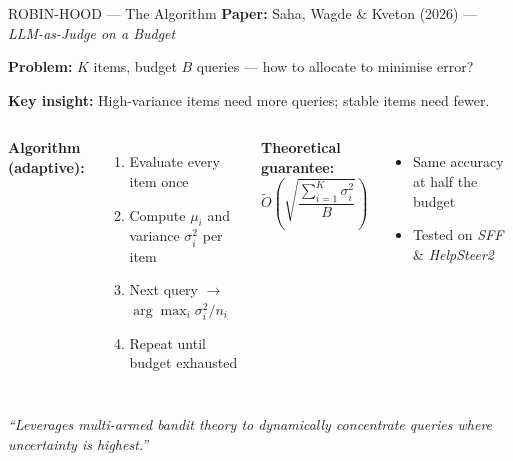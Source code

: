 \documentclass[11pt, aspectratio=169]{beamer}
\begin{document}
\begin{frame}{ROBIN-HOOD --- The Algorithm}
  \textbf{Paper:} Saha, Wagde \& Kveton (2026) --- \textit{LLM-as-Judge on a Budget}

  \vspace{0.1cm}
  \textbf{Problem:} $K$ items, budget $B$ queries --- how to allocate to minimise error?

  \vspace{0.1cm}
  \textbf{Key insight:} \alert{High-variance} items need more queries; stable items need fewer.

  \vspace{0.1cm}
  \begin{columns}[T]
      \textbf{Algorithm (adaptive):}
      \begin{enumerate}\footnotesize
        \item Evaluate every item once
        \item Compute $\mu_i$ and variance $\sigma^2_i$ per item
        \item Next query $\rightarrow$ $\arg\max_i \sigma^2_i / n_i$
        \item Repeat until budget exhausted
      \end{enumerate}

      \textbf{Theoretical guarantee:}
      \[
      \tilde{O}\!\left(\sqrt{\frac{\textstyle\sum_{i=1}^K \sigma_i^2}{B}}\right)
      \]
      \begin{itemize}\footnotesize
        \item Same accuracy at \alert{half the budget}
        \item Tested on \textit{SFF} \& \textit{HelpSteer2}
      \end{itemize}
  \end{columns}

  \vspace{0.1cm}
  {\footnotesize\textit{``Leverages multi-armed bandit theory to dynamically
  concentrate queries where uncertainty is highest.''}}
\end{frame}
\end{document}

